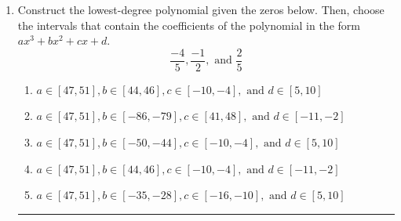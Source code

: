 \documentclass[14pt]{extbook}
\newcommand{\litem}[1]{\item#1\hspace*{-1cm}\rule{\textwidth}{0.4pt}}
\begin{document}
\begin{enumerate}
\litem{
Construct the lowest-degree polynomial given the zeros below. Then, choose the intervals that contain the coefficients of the polynomial in the form $ax^3+bx^2+cx+d$.\[ \frac{-4}{5}, \frac{-1}{2}, \text{ and } \frac{2}{5} \]\begin{enumerate}[label=\Alph*.]
\item \( a \in [47, 51], b \in [44, 46], c \in [-10, -4], \text{ and } d \in [5, 10] \)
\item \( a \in [47, 51], b \in [-86, -79], c \in [41, 48], \text{ and } d \in [-11, -2] \)
\item \( a \in [47, 51], b \in [-50, -44], c \in [-10, -4], \text{ and } d \in [5, 10] \)
\item \( a \in [47, 51], b \in [44, 46], c \in [-10, -4], \text{ and } d \in [-11, -2] \)
\item \( a \in [47, 51], b \in [-35, -28], c \in [-16, -10], \text{ and } d \in [5, 10] \)


\end{enumerate}}
\end{enumerate}
\end{document}
